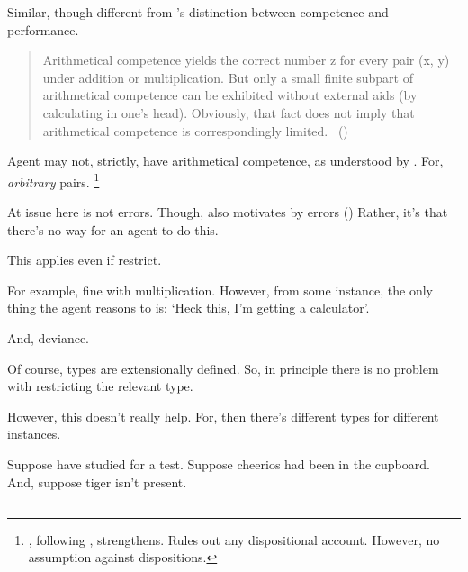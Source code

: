 \begin{note}
  Similar, though different from \citeauthor{Chomsky:2015aa}'s distinction between competence and performance.

  \begin{quote}
    Arithmetical competence yields the correct number z for every pair (x, y) under addition or multiplication.
    But only a small finite subpart of arithmetical competence can be exhibited without external aids (by calculating in one's head).
    Obviously, that fact does not imply that arithmetical competence is correspondingly limited.\newline
    \mbox{ }\hfill\mbox{(\citeyear[xii]{Chomsky:2015aa})}
  \end{quote}

  Agent may not, strictly, have arithmetical competence, as understood by \citeauthor{Chomsky:2015aa}.
  For, \emph{arbitrary} pairs.%
  \footnote{
    \citeauthor{Boghossian:2008vf}, following \citeauthor{Kripke:1982aa}, strengthens.
    Rules out any dispositional account.
    However, no assumption against dispositions.
  }

  At issue here is not errors.
  Though, \citeauthor{Chomsky:2015aa} also motivates by errors (\citeyear[2]{Chomsky:2015aa})
  Rather, it's that there's no way for an agent to do this.
\end{note}

\begin{note}
  This applies even if restrict.

  For example, fine with multiplication.
  However, from some instance, the only thing the agent reasons to is:
  `Heck this, I'm getting a calculator'.
\end{note}

\begin{note}
  And, deviance.
\end{note}

\begin{note}
  Of course, types are extensionally defined.
  So, in principle there is no problem with restricting the relevant type.

  However, this doesn't really help.
  For, then there's different types for different instances.

  Suppose have studied for a test.
  Suppose cheerios had been in the cupboard.
  And, suppose tiger isn't present.
\end{note}

\subsection{}
\label{sec:represntative}

